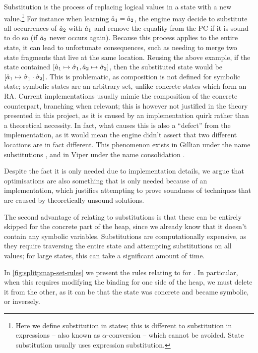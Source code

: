 Substitution is the process of replacing logical values in a state with a new value.\footnote{Here we define substitution in states; this is different to substitution in expressions -- also known as $\alpha$-conversion -- which cannot be avoided. State substitution usually uses expression substitution.} For instance when learning $\hat{a}_1 = \hat{a}_2$, the engine may decide to substitute all occurrences of $\hat{a}_2$ with $\hat{a}_1$ and remove the equality from the PC if it is sound to do so (if $\hat{a}_2$ never occurs again). Because this process applies to the entire state, it can lead to unfortunate consequences, such as needing to merge two state fragments that live at the same location. Reusing the above example, if the state contained $[\hat{a}_1 \mapsto \hat{\sigma}_1, \hat{a}_2\mapsto \hat{\sigma}_2]$, then the substituted state would be $[\hat{a}_1 \mapsto \hat{\sigma}_1 \cdot \hat{\sigma}_2]$. This is problematic, as composition is not defined for symbolic state; symbolic states are an arbitrary set, unlike concrete states which form an RA. Current implementations usually mimic the composition of the concrete counterpart, branching when relevant; this is however not justified in the theory presented in this project, as it is caused by an implementation quirk rather than a theoretical necessity. In fact, what causes this is also a ``defect'' from the implementation, as it would mean the engine didn't assert that two different locations are in fact different. This phenomenon exists in Gillian under the name substitutions \cite{gillian2}, and in Viper under the name consolidation \cite{viper-consolidation}.

Despite the fact it is only needed due to implementation details, we argue that optimisations are also something that is only needed because of an implementation, which justifies attempting to prove soundness of techniques that are caused by theoretically unsound solutions.

The second advantage of \SplitPMap{} relating to substitutions is that these can be entirely skipped for the concrete part of the heap, since we already know that it doesn't contain any symbolic variables. Substitutions are computationally expensive, as they require traversing the entire state and attempting substitutions on all values; for large states, this can take a significant amount of time.

In \autoref{fig:splitpmap-set-rules} we present the rules relating to  for \SplitPMap. In particular, when this requires modifying the binding for one side of the heap, we must delete it from the other, as it can be that the state was concrete and became symbolic, or inversely.

